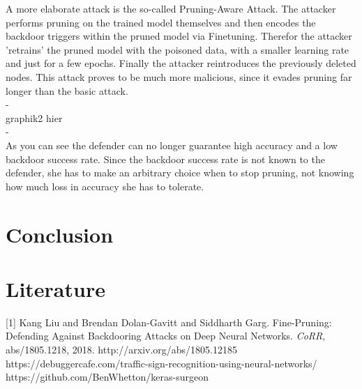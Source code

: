 \documentclass[a4paper,12pt]{article}
\begin{document}
A more elaborate attack is the so-called Pruning-Aware Attack. The attacker performs pruning on the trained model themselves and then encodes the backdoor triggers within the pruned model via Finetuning. Therefor the attacker 'retrains' the pruned model with the poisoned data, with a smaller learning rate and just for a few epochs. Finally the attacker reintroduces the previously deleted nodes. This attack proves to be much more malicious, since it evades pruning far longer than the basic attack.
\\
-\\
graphik2 hier\\
-\\
As you can see the defender can no longer guarantee high accuracy and a low backdoor success rate. Since the backdoor success rate is not known to the defender, she has to make an arbitrary choice when to stop pruning, not knowing how much loss in accuracy she has to tolerate.








\section{Conclusion}
	
	
	
	
	
\section{Literature}
[1]  Kang Liu and Brendan Dolan-Gavitt and Siddharth Garg. Fine-Pruning: Defending Against Backdooring Attacks on Deep Neural Networks. \textit{CoRR}, abs/1805.1218, 2018. http://arxiv.org/abs/1805.12185     \newline
[2] https://debuggercafe.com/traffic-sign-recognition-using-neural-networks/  \newline
[3] https://github.com/BenWhetton/keras-surgeon \newline
	
	
	
	
	
	
	
	
	
	
	
	
	
	
	
	
	
	
	
	
	
\end{document}
